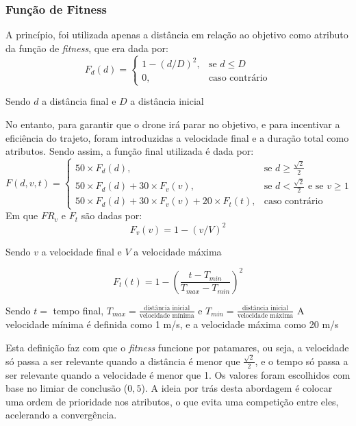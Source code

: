 \documentclass[12pt]{article}
\begin{document}
\subsubsection{Função de Fitness}
A princípio, foi utilizada apenas a distância em relação ao objetivo como atributo da função de \textit{fitness}, que era dada por:
\[
F_d(d)=
\begin{cases}
     1 - (d/D)^2, & \text{se }d \leq D\\
     0,      & \text{caso contrário}
\end{cases}
\]
\begin{center}
    Sendo $d$ a distância final e $D$ a distância inicial
\end{center}
No entanto, para garantir que o drone irá parar no objetivo, e para incentivar a eficiência do trajeto, foram introduzidas a velocidade final e a duração total como atributos. Sendo assim, a função final utilizada é dada por: 
\[
F(d, v, t)=
\begin{cases}
     50 \times F_d(d),                                       & \text{se }d \geq \frac{\sqrt{2}}{2}\\
     50 \times F_d(d) + 30 \times F_v(v),                    & \text{se }d < \frac{\sqrt{2}}{2}\text{ e se }v \geq 1\\
     50 \times F_d(d) + 30 \times F_v(v) + 20 \times F_t(t), & \text{caso contrário}
\end{cases}
\]
    Em que $FR_v$ e $F_t$ são dadas por:
\[
F_v(v)=1 - (v/V)^2
\]
\begin{center}
    Sendo $v$ a velocidade final e $V$ a velocidade máxima
\end{center}
\[
F_t(t)=1 - \left(\frac{t - T_{min}}{T_{max}-T_{min}}\right)^2
\]
\begin{center}
    Sendo $t =$ tempo final, $T_{max} = \frac{\text{distância inicial}}{\text{velocidade mínima}}$ e $T_{min} = \frac{\text{distância inicial}}{\text{velocidade máxima}}$ \newline
    A velocidade mínima é definida como 1 m/s, e a velocidade máxima como 20 m/s
\end{center}

Esta definição faz com que o \textit{fitness} funcione por patamares, ou seja, a velocidade só passa a ser relevante quando a distância é menor que $\frac{\sqrt{2}}{2}$, e o tempo só passa a ser relevante quando a velocidade é menor que 1. Os valores foram escolhidos com base no limiar de conclusão ($0,5$). A ideia por trás desta abordagem é colocar uma ordem de prioridade nos atributos, o que evita uma competição entre eles, acelerando a convergência.
\end{document}

